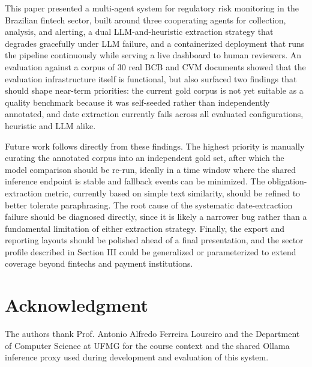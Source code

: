 \documentclass[conference]{IEEEtran}
\begin{document}
This paper presented a multi-agent system for regulatory risk monitoring in the Brazilian fintech sector, built around three cooperating agents for collection, analysis, and alerting, a dual LLM-and-heuristic extraction strategy that degrades gracefully under LLM failure, and a containerized deployment that runs the pipeline continuously while serving a live dashboard to human reviewers. An evaluation against a corpus of 30 real BCB and CVM documents showed that the evaluation infrastructure itself is functional, but also surfaced two findings that should shape near-term priorities: the current gold corpus is not yet suitable as a quality benchmark because it was self-seeded rather than independently annotated, and date extraction currently fails across all evaluated configurations, heuristic and LLM alike.

Future work follows directly from these findings. The highest priority is manually curating the annotated corpus into an independent gold set, after which the model comparison should be re-run, ideally in a time window where the shared inference endpoint is stable and fallback events can be minimized. The obligation-extraction metric, currently based on simple text similarity, should be refined to better tolerate paraphrasing. The root cause of the systematic date-extraction failure should be diagnosed directly, since it is likely a narrower bug rather than a fundamental limitation of either extraction strategy. Finally, the export and reporting layouts should be polished ahead of a final presentation, and the sector profile described in Section III could be generalized or parameterized to extend coverage beyond fintechs and payment institutions.

\section*{Acknowledgment}

The authors thank Prof. Antonio Alfredo Ferreira Loureiro and the Department of Computer Science at UFMG for the course context and the shared Ollama inference proxy used during development and evaluation of this system.
\end{document}
